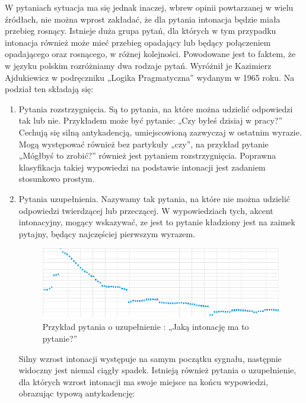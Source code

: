 \documentclass[a4paper,12 pt]{article}
\begin{document}
W pytaniach sytuacja ma się jednak inaczej, wbrew opinii powtarzanej w wielu źródłach, nie można wprost zakładać, że dla pytania intonacja będzie miała przebieg rosnący. Istnieje duża grupa pytań, dla których w tym przypadku intonacja również może mieć przebieg opadający lub będący połączeniem opadającego oraz rosnącego, w różnej kolejności. Powodowane jest to faktem, że w języku polskim rozróżniamy dwa rodzaje pytań. Wyróżnił je Kazimierz Ajdukiewicz w podręczniku „Logika Pragmatyczna” wydanym w 1965 roku.
Na podział ten składają się:
\begin{enumerate}
\item Pytania rozstrzygnięcia. Są to pytania, na które można udzielić odpowiedzi tak lub nie. Przykładem może być pytanie: „Czy byłeś dzisiaj w pracy?”  Cechują się silną antykadencją, umiejscowioną zazwyczaj w ostatnim wyrazie. Mogą występować również bez partykuły „czy”, na przykład pytanie „Mógłbyś to zrobić?” również jest pytaniem rozstrzygnięcia. Poprawna klasyfikacja takiej wypowiedzi na podstawie intonacji jest zadaniem stosunkowo prostym.
\item Pytania uzupełnienia. Nazywamy tak pytania, na które nie można udzielić odpowiedzi twierdzącej lub przeczącej. W wypowiedziach tych, akcent intonacyjny, mogący wskazywać, ze jest to pytanie kładziony jest na zaimek pytajny, będący najczęściej pierwszym wyrazem.

\begin{figure}[h]

\centering
\includegraphics[scale=0.9]{pytanie_uzupelnienie.png}
\caption{Przykład pytania o uzupełnienie : „Jaką intonację ma to pytanie?”}

\end{figure}
\FloatBarrier
Silny wzrost intonacji występuje na samym początku sygnału, następnie widoczny jest niemal ciągły spadek.
Istnieją również pytania o uzupełnienie, dla których wzrost intonacji ma swoje miejsce na końcu wypowiedzi, obrazując typową antykadencję:
 \begin{enumerate}


\end{enumerate}
\end{enumerate}
\end{document}
